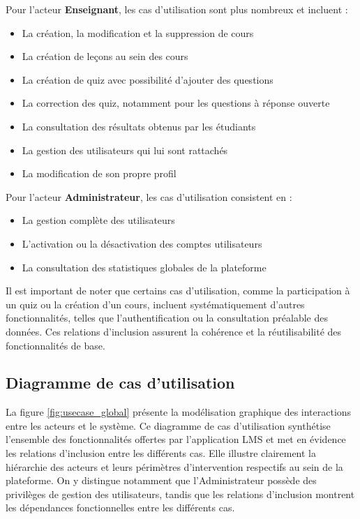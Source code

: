 \documentclass[12pt,a4paper]{report}
\begin{document}
Pour l'acteur \textbf{Enseignant}, les cas d'utilisation sont plus nombreux et incluent :
\begin{itemize}
    \item La création, la modification et la suppression de cours
    \item La création de leçons au sein des cours
    \item La création de quiz avec possibilité d'ajouter des questions
    \item La correction des quiz, notamment pour les questions à réponse ouverte
    \item La consultation des résultats obtenus par les étudiants
    \item La gestion des utilisateurs qui lui sont rattachés
    \item La modification de son propre profil
\end{itemize}

Pour l'acteur \textbf{Administrateur}, les cas d'utilisation consistent en :
\begin{itemize}
    \item La gestion complète des utilisateurs 
    \item L'activation ou la désactivation des comptes utilisateurs
    \item La consultation des statistiques globales de la plateforme
\end{itemize}

Il est important de noter que certains cas d'utilisation, comme la participation à un quiz ou la création d'un cours, incluent systématiquement d'autres fonctionnalités, telles que l'authentification ou la consultation préalable des données. Ces relations d'inclusion assurent la cohérence et la réutilisabilité des fonctionnalités de base.

\subsection{Diagramme de cas d'utilisation}
La figure \ref{fig:usecase_global} présente la modélisation graphique des interactions entre les acteurs et le système. Ce diagramme de cas d'utilisation synthétise l'ensemble des fonctionnalités offertes par l'application LMS et met en évidence les relations d'inclusion entre les différents cas. Elle illustre clairement la hiérarchie des acteurs et leurs périmètres d'intervention respectifs au sein de la plateforme. On y distingue notamment que l'Administrateur possède des privilèges de gestion des utilisateurs, tandis que les relations d'inclusion montrent les dépendances fonctionnelles entre les différents cas.
\end{document}

